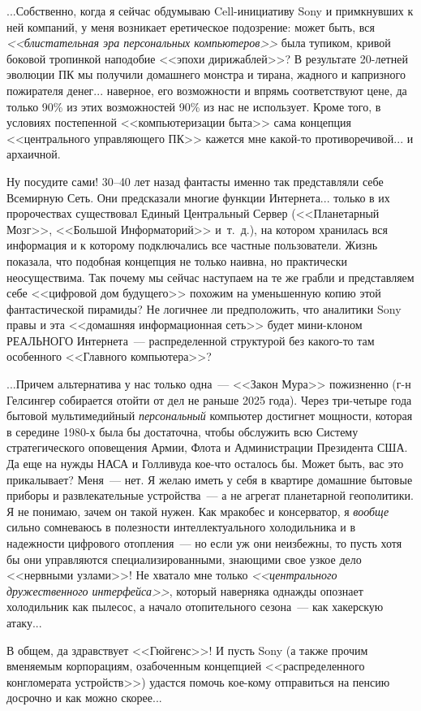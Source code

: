 \documentclass{scrbook}
\newcommand{\flqq}{<<}
\newcommand{\frqq}{>>}
\newcommand{\mdash}{~--- }
\newcommand{\ndash}{--}
\begin{document}
...Собственно, когда я сейчас обдумываю Cell-инициативу Sony и примкнувших к ней компаний, у меня возникает еретическое подозрение: может быть, вся \emph{{\flqq}блистательная эра персональных компьютеров{\frqq}} была тупиком, кривой боковой тропинкой наподобие {\flqq}эпохи дирижаблей{\frqq}? В результате 20-летней эволюции ПК мы получили домашнего монстра и тирана, жадного и капризного пожирателя денег... наверное, его возможности и впрямь соответствуют цене, да только 90\% из этих возможностей 90\% из нас не использует. Кроме того, в условиях постепенной {\flqq}компьютеризации быта{\frqq} сама концепция {\flqq}центрального управляющего ПК{\frqq} кажется мне какой-то противоречивой... и архаичной.

Ну посудите сами! 30{\ndash}40 лет назад фантасты именно так представляли себе Всемирную Сеть. Они предсказали многие функции Интернета... только в их пророчествах существовал Единый Центральный Сервер ({\flqq}Планетарный Мозг{\frqq}, {\flqq}Большой Информаторий{\frqq} и~т.~д.), на котором хранилась вся информация и к которому подключались все частные пользователи. Жизнь показала, что подобная концепция не только наивна, но практически неосуществима. Так почему мы сейчас наступаем на те же грабли и представляем себе {\flqq}цифровой дом будущего{\frqq} похожим на уменьшенную копию этой фантастической пирамиды? Не логичнее ли предположить, что аналитики Sony правы и эта {\flqq}домашняя информационная сеть{\frqq} будет мини-клоном РЕАЛЬНОГО Интернета{\mdash}распределенной структурой без какого-то там особенного {\flqq}Главного компьютера{\frqq}?

...Причем альтернатива у нас только одна{\mdash}{\flqq}Закон Мура{\frqq} пожизненно (г-н Гелсингер собирается отойти от дел не раньше 2025 года). Через три-четыре года бытовой мультимедийный \emph{персональный} компьютер достигнет мощности, которая в середине 1980-х была бы достаточна, чтобы обслужить всю Систему стратегического оповещения Армии, Флота и Администрации Президента США. Да еще на нужды НАСА и Голливуда кое-что осталось бы. Может быть, вас это прикалывает? Меня{\mdash}нет. Я желаю иметь у себя в квартире домашние бытовые приборы и развлекательные устройства{\mdash}а не агрегат планетарной геополитики. Я не понимаю, зачем он такой нужен. Как мракобес и консерватор, я \emph{вообще} сильно сомневаюсь в полезности интеллектуального холодильника и в надежности цифрового отопления{\mdash}но если уж они неизбежны, то пусть хотя бы они управляются специализированными, знающими свое узкое дело {\flqq}нервными узлами{\frqq}! Не  хватало мне только \emph{{\flqq}центрального дружественного интерфейса{\frqq}}, который наверняка однажды опознает холодильник как пылесос, а начало отопительного сезона{\mdash}как хакерскую атаку...

В общем, да здравствует {\flqq}Гюйгенс{\frqq}! И пусть Sony (а также прочим вменяемым корпорациям, озабоченным концепцией {\flqq}распределенного конгломерата устройств{\frqq}) удастся помочь кое-кому отправиться на пенсию досрочно и как можно скорее...
\end{document}
